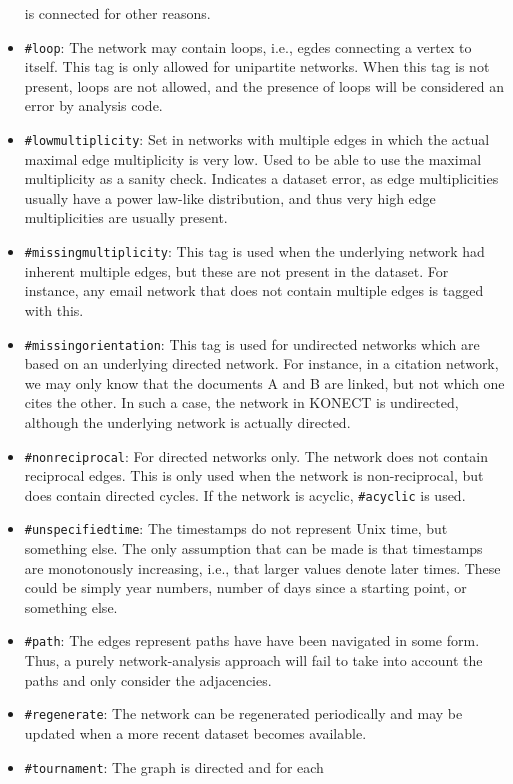 \documentclass{article}
\begin{document}
\begin{itemize}
  is connected for other reasons. 
\item \texttt{\#loop}: The network may contain loops, i.e.,
  egdes connecting a vertex to itself.  This tag is only
  allowed for unipartite networks.  When this tag is not
  present, loops are not allowed, and the presence of loops
  will be considered an error by analysis code.
\item \texttt{\#lowmultiplicity}:  Set in networks with multiple
  edges in which the actual maximal edge multiplicity is very
  low.  Used to be able to use the maximal multiplicity as a
  sanity check.  Indicates a dataset error, as edge
  multiplicities usually have a power law-like distribution, and
  thus very high edge multiplicities are usually present. 
\item \texttt{\#missingmultiplicity}:  This tag is used when the
  underlying network had inherent multiple edges, but these are
  not present in the dataset.  For instance, any email network
  that does not contain multiple edges is tagged with this. 
\item \texttt{\#missingorientation}: This tag is used for
  undirected networks which are based on an underlying
  directed network.  For instance, in a citation network, we
  may only know that the documents A and B are linked, but not
  which one cites the other.  In such a case, the network in
  KONECT is undirected, although the underlying network is
  actually directed.
\item \texttt{\#nonreciprocal}:  For directed networks only.
  The network does not contain reciprocal edges.  This is only
  used when the network is non-reciprocal, but does contain
  directed cycles.  If the network is acyclic,
  \texttt{\#acyclic} is used. 
\item \texttt{\#unspecifiedtime}:  The timestamps do not represent Unix
  time, but something else.  The only assumption that can be made is
  that timestamps are monotonously increasing, i.e., that larger values
  denote later times.  These could be simply year numbers, number of
  days since a starting point, or something else. 
\item \texttt{\#path}:  The edges represent paths have have been
  navigated in some form.  Thus, a purely network-analysis approach will
  fail to take into account the paths and only consider the
  adjacencies. 
\item \texttt{\#regenerate}: The network can be regenerated
  periodically and may be updated when a more recent dataset
  becomes available.
\item \texttt{\#tournament}:  The graph is directed and for each

\end{itemize}
\end{document}
